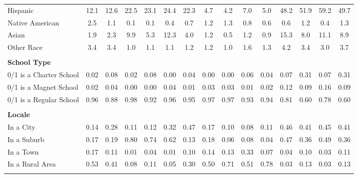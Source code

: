 \begin{tabular*}{\linewidth}{@{\extracolsep{\fill} } lcccccccccccccc}
\hspace{0.2cm}Hispanic&12.1&12.6&22.5&23.1&24.4&22.3&4.7&4.2&7.0&5.0&48.2&51.9&59.2&49.7\\%
\hspace{0.2cm}Native American&2.5&1.1&0.1&0.1&0.4&0.7&1.2&1.3&0.8&0.6&0.6&1.2&0.4&1.3\\%
\hspace{0.2cm}Asian&1.9&2.3&9.9&5.3&12.3&4.0&1.2&0.5&1.2&0.9&15.3&8.0&11.1&8.9\\%
\hspace{0.2cm}Other Race&3.4&3.4&1.0&1.1&1.1&1.2&1.2&1.0&1.6&1.3&4.2&3.4&3.0&3.7\\%
&&&&&&&&&&&&&&\\%
\multicolumn{15}{l}{\bfseries School Type}\\%
\hspace{0.2cm}0/1 is a Charter School&0.02&0.08&0.02&0.08&0.00&0.04&0.00&0.00&0.06&0.04&0.07&0.31&0.07&0.31\\%
\hspace{0.2cm}0/1 is a Magnet School&0.02&0.04&0.00&0.00&0.04&0.01&0.03&0.03&0.01&0.02&0.12&0.09&0.16&0.09\\%
\hspace{0.2cm}0/1 is a Regular School&0.96&0.88&0.98&0.92&0.96&0.95&0.97&0.97&0.93&0.94&0.81&0.60&0.78&0.60\\%
&&&&&&&&&&&&&&\\%
\multicolumn{15}{l}{\bfseries Locale}\\%
\hspace{0.2cm}In a City&0.14&0.28&0.11&0.12&0.32&0.47&0.17&0.10&0.08&0.11&0.46&0.41&0.45&0.41\\%
\hspace{0.2cm}In a Suburb&0.17&0.19&0.80&0.74&0.62&0.13&0.18&0.06&0.08&0.04&0.47&0.36&0.49&0.36\\%
\hspace{0.2cm}In a Town&0.17&0.11&0.01&0.04&0.01&0.10&0.14&0.13&0.33&0.07&0.04&0.10&0.03&0.11\\%
\hspace{0.2cm}In a Rural Area&0.53&0.41&0.08&0.11&0.05&0.30&0.50&0.71&0.51&0.78&0.03&0.13&0.03&0.13\\%
&&&&&&&&&&&&&&\\%
\hline%
\end{tabular*}